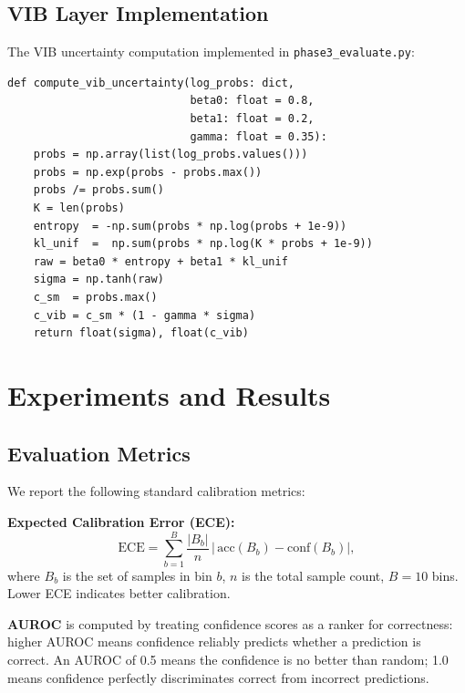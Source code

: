 \documentclass[conference]{IEEEtran}
\begin{document}
\subsection{VIB Layer Implementation}

The VIB uncertainty computation implemented in
{\small\texttt{phase3\_evaluate.py}}:

\begin{lstlisting}[caption={VIB Layer sigma computation},
                   label={lst:vib}]
def compute_vib_uncertainty(log_probs: dict,
                            beta0: float = 0.8,
                            beta1: float = 0.2,
                            gamma: float = 0.35):
    probs = np.array(list(log_probs.values()))
    probs = np.exp(probs - probs.max())
    probs /= probs.sum()
    K = len(probs)
    entropy  = -np.sum(probs * np.log(probs + 1e-9))
    kl_unif  =  np.sum(probs * np.log(K * probs + 1e-9))
    raw = beta0 * entropy + beta1 * kl_unif
    sigma = np.tanh(raw)
    c_sm  = probs.max()
    c_vib = c_sm * (1 - gamma * sigma)
    return float(sigma), float(c_vib)
\end{lstlisting}

\section{Experiments and Results}
\label{sec:experiments}

\subsection{Evaluation Metrics}

We report the following standard calibration metrics:

\textbf{Expected Calibration Error (ECE):}
\begin{equation}
    \text{ECE} = \sum_{b=1}^{B}
        \frac{|B_b|}{n}\,
        \bigl|\,\text{acc}(B_b) - \text{conf}(B_b)\bigr|,
    \label{eq:ece}
\end{equation}
where $B_b$ is the set of samples in bin $b$, $n$ is the total
sample count, $B=10$ bins. Lower ECE indicates better calibration.

\textbf{AUROC} is computed by treating confidence scores as a ranker
for correctness: higher AUROC means confidence reliably predicts
whether a prediction is correct. An AUROC of 0.5 means the confidence
is no better than random; 1.0 means confidence perfectly discriminates
correct from incorrect predictions.
\end{document}
